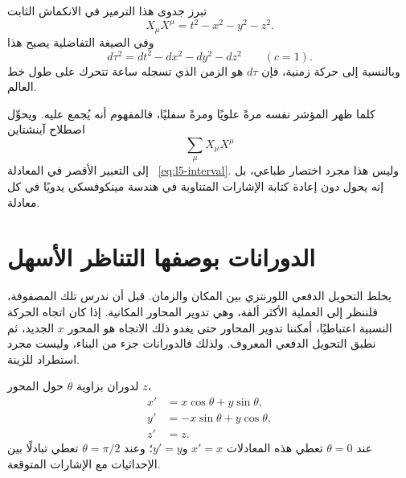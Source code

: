 \begin{classroomqa}
\end{classroomqa}

تبرز جدوى هذا الترميز في الانكماش الثابت
\begin{equation}
X_\mu X^\mu=t^2-x^2-y^2-z^2.
\label{eq:l5-interval}
\end{equation}
وفي الصيغة التفاضلية يصبح هذا
\begin{equation}
d\tau^2=dt^2-dx^2-dy^2-dz^2
\qquad (c=1).
\label{eq:l5-proper-time}
\end{equation}
وبالنسبة إلى حركة زمنية، فإن \(d\tau\) هو الزمن الذي تسجله ساعة تتحرك على طول خط العالم.

كلما ظهر المؤشر نفسه مرةً علويًا ومرةً سفليًا، فالمفهوم أنه يُجمع عليه. ويحوِّل اصطلاح آينشتاين
\begin{equation}
\sum_{\mu}X_\mu X^\mu
\end{equation}
إلى التعبير الأقصر في المعادلة ~\eqref{eq:l5-interval}. وليس هذا مجرد اختصار طباعي، بل إنه يحول دون إعادة كتابة الإشارات المتناوبة في هندسة مينكوفسكي يدويًا في كل معادلة.

\begin{classroomqa}
\end{classroomqa}

\section{الدورانات بوصفها التناظر الأسهل}

يخلط التحويل الدفعي اللورنتزي بين المكان والزمان. قبل أن ندرس تلك المصفوفة، فلننظر إلى العملية الأكثر ألفة، وهي تدوير المحاور المكانية. إذا كان اتجاه الحركة النسبية اعتباطيًا، أمكننا تدوير المحاور حتى يغدو ذلك الاتجاه هو المحور \(x\) الجديد، ثم نطبق التحويل الدفعي المعروف. ولذلك فالدورانات جزء من البناء، وليست مجرد استطراد للزينة.

لدوران بزاوية \(\theta\) حول المحور \(z\)،
\begin{align}
x'&=x\cos\theta+y\sin\theta,\nonumber\\
y'&=-x\sin\theta+y\cos\theta,\label{eq:l5-rotation}\\
z'&=z.\nonumber
\end{align}
عند \(\theta=0\) تعطي هذه المعادلات \(x'=x\) و\(y'=y\)؛ وعند \(\theta=\pi/2\) تعطي تبادلًا بين الإحداثيات مع الإشارات المتوقعة.

